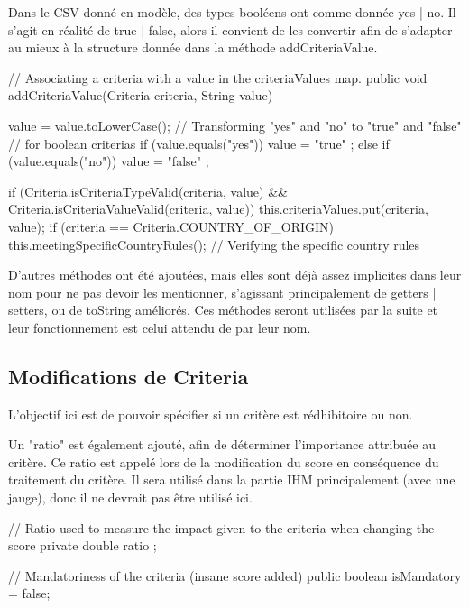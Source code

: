 \documentclass{mytex}
\begin{document}

Dans le CSV donné en modèle, des types booléens ont comme donnée yes | no. Il s'agit en réalité de true | false, alors il convient de les convertir afin de s'adapter au mieux à la structure donnée dans la méthode addCriteriaValue.

\begin{codebox}
// Associating a criteria with a value in the criteriaValues map.
public void addCriteriaValue(Criteria criteria, String value) {
	value = value.toLowerCase();
	// Transforming "yes" and "no" to "true" and "false"
	// for boolean criterias
	if (value.equals("yes")) value = "true" ;
	else if (value.equals("no")) value = "false" ;
	
	if (Criteria.isCriteriaTypeValid(criteria, value) && Criteria.isCriteriaValueValid(criteria, value)) {
		this.criteriaValues.put(criteria, value);
	}
	if (criteria == Criteria.COUNTRY_OF_ORIGIN) {
		this.meetingSpecificCountryRules(); // Verifying the specific country rules
	}
}
\end{codebox}


D'autres méthodes ont été ajoutées, mais elles sont déjà assez implicites dans leur nom pour ne pas devoir les mentionner, s'agissant principalement de getters | setters, ou de toString améliorés. Ces méthodes seront utilisées par la suite et leur fonctionnement est celui attendu de par leur nom.

\subsection{Modifications de Criteria}

L'objectif ici est de pouvoir spécifier si un critère est rédhibitoire ou non.

Un "ratio" est également ajouté, afin de déterminer l'importance attribuée au critère. Ce ratio est appelé lors de la modification du score en conséquence du traitement du critère. Il sera utilisé dans la partie IHM principalement (avec une jauge), donc il ne devrait pas être utilisé ici.


\begin{codebox}
// Ratio used to measure the impact given to the criteria when changing the score
private double ratio ;

// Mandatoriness of the criteria (insane score added)
public boolean isMandatory = false; 
\end{codebox}
\end{document}
